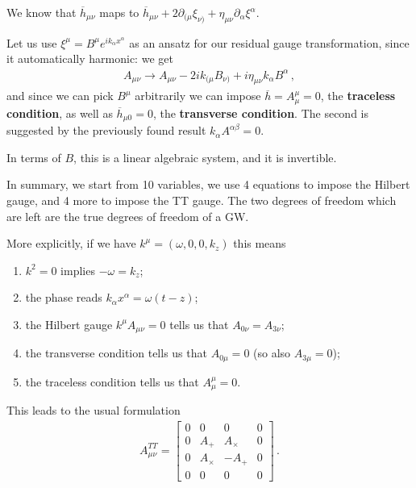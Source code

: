 \documentclass[main.tex]{subfiles}
\begin{document}
We know that \(\overline{h}_{\mu \nu }\) maps to \(\overline{h}_{\mu \nu } + 2 \partial_{(\mu } \xi_{\nu )} + \eta_{\mu \nu } \partial_{\alpha } \xi^{\alpha }\). 

Let us use \(\xi^{\mu } = B^{\mu } e^{i k_{\alpha } x^{ \alpha }}\) as an ansatz for our residual gauge transformation, since it automatically harmonic: we get 
%
\begin{align}
A_{\mu \nu } \to A_{\mu \nu } - 2 i k_{(\mu } B_{\nu )} + i \eta_{\mu \nu } k_{\alpha } B^{\alpha }
\,,
\end{align}
%
and since we can pick \(B^{\mu }\) arbitrarily we can impose \(\overline{h} = A^{\mu }_{\mu } = 0\), the \textbf{traceless condition}, as well as \(\overline{h}_{\mu 0} = 0\), the \textbf{transverse condition}.
The second is suggested by the previously found result \(k_\alpha A^{\alpha \beta } = 0\). 

In terms of \(B\), this is a linear algebraic system, and it is invertible.

In summary, we start from 10 variables, we use 4 equations to impose the Hilbert gauge, and 4 more to impose the TT gauge. 
The two degrees of freedom which are left are the true degrees of freedom of a GW. 

More explicitly, if we have \(k^{\mu } = (\omega, 0, 0, k_z)\) this means 
\begin{enumerate}
    \item \(k^2 =0 \) implies \(- \omega = k_z\);
    \item the phase reads \(k_\alpha x^{\alpha } = \omega (t - z)\);
    \item the Hilbert gauge \(k^{\mu } A_{\mu \nu } = 0\) tells us that \(A_{0 \nu } = A_{3 \nu }\); 
    \item the transverse condition tells us that \(A_{0 \mu } = 0\) (so also \(A_{3 \mu } = 0\));
    \item the traceless condition tells us that \(A^{\mu }_{\mu } = 0\).
\end{enumerate}

This leads to the usual formulation 
%
\begin{align}
A_{\mu \nu }^{TT} = \left[\begin{array}{cccc}
0 & 0 & 0 & 0 \\ 
0 & A_+ & A_\times & 0 \\ 
0 & A_\times  & - A_+ & 0 \\ 
0 & 0 & 0 & 0
\end{array}\right]
\,.
\end{align}
\end{document}
